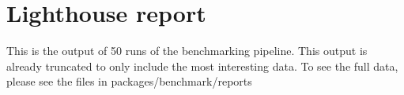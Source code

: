 \chapter{Lighthouse report} %

\label{appendix:lighthouse-report}

This is the output of 50 runs of the benchmarking pipeline.
This output is already truncated to only include the most interesting data.
To see the full data, please see the files in packages/benchmark/reports


